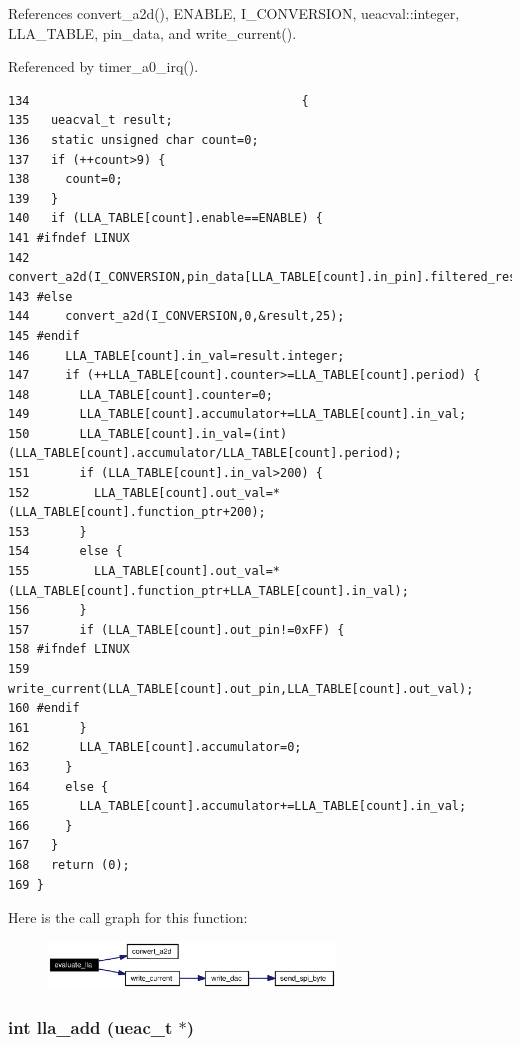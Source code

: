 References convert\_\-a2d(), ENABLE, I\_\-CONVERSION, ueacval::integer, LLA\_\-TABLE, pin\_\-data, and write\_\-current().

Referenced by timer\_\-a0\_\-irq().

\footnotesize\begin{verbatim}134                                      {
135   ueacval_t result;
136   static unsigned char count=0;
137   if (++count>9) {
138     count=0;
139   }
140   if (LLA_TABLE[count].enable==ENABLE) {
141 #ifndef LINUX
142     convert_a2d(I_CONVERSION,pin_data[LLA_TABLE[count].in_pin].filtered_result,&result,LLA_TABLE[count].in_pin);
143 #else 
144     convert_a2d(I_CONVERSION,0,&result,25);
145 #endif
146     LLA_TABLE[count].in_val=result.integer;      
147     if (++LLA_TABLE[count].counter>=LLA_TABLE[count].period) {
148       LLA_TABLE[count].counter=0;
149       LLA_TABLE[count].accumulator+=LLA_TABLE[count].in_val;
150       LLA_TABLE[count].in_val=(int)(LLA_TABLE[count].accumulator/LLA_TABLE[count].period);
151       if (LLA_TABLE[count].in_val>200) {
152         LLA_TABLE[count].out_val=*(LLA_TABLE[count].function_ptr+200);
153       }
154       else {
155         LLA_TABLE[count].out_val=*(LLA_TABLE[count].function_ptr+LLA_TABLE[count].in_val);
156       }
157       if (LLA_TABLE[count].out_pin!=0xFF) {
158 #ifndef LINUX
159         write_current(LLA_TABLE[count].out_pin,LLA_TABLE[count].out_val);
160 #endif
161       }
162       LLA_TABLE[count].accumulator=0;
163     }
164     else {
165       LLA_TABLE[count].accumulator+=LLA_TABLE[count].in_val;
166     }
167   }
168   return (0);
169 }
\end{verbatim}\normalsize 




Here is the call graph for this function:\begin{figure}[H]
\begin{center}
\leavevmode
\includegraphics[width=216pt]{lla_8h_a7_cgraph}
\end{center}
\end{figure}
\subsubsection{\setlength{\rightskip}{0pt plus 5cm}int lla\_\-add ({\bf ueac\_\-t} $\ast$)}\label{lla_8h_a4}




